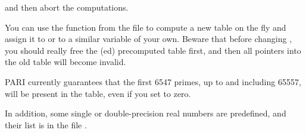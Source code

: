 
\noindent and then abort the computations.

You can use the function  from the file  to
compute a new table on the fly and assign it to  or to a
similar variable of your own. Beware that before changing ,
you should really free the (ed) precomputed table first, and then
all pointers into the old table will become invalid.

PARI currently guarantees that the first 6547 primes, up to and including
65557, will be present in the table, even if you set  to zero.

In addition, some single or double-precision real numbers are predefined,
and their list is in the file .
\vfill\eject
